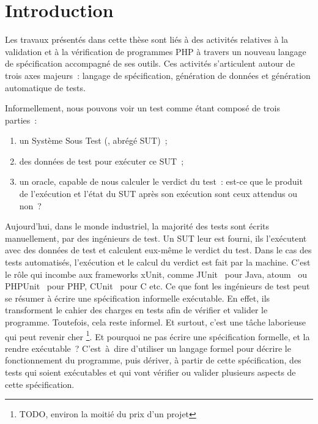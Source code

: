 \chapter{Introduction}
\label{chapter:introduction}

\minitoc

Les travaux présentés dans cette thèse sont liés à des activités relatives à la
validation et à la vérification de programmes PHP à travers un nouveau langage
de spécification accompagné de ses outils. Ces activités s'articulent autour de
trois axes majeurs~: langage de spécification, génération de données et
génération automatique de tests.

Informellement, nous pouvons voir un test comme étant composé de trois parties~:

\begin{enumerate}

\item un Système Sous Test (, abrégé {\strong
SUT})~;

\item des {\strong données de test} pour exécuter ce SUT~;

\item un {\strong oracle}, capable de nous calculer le verdict du test~: est-ce
que le produit de l'exécution et l'état du SUT après son exécution sont ceux
attendus ou non~?

\end{enumerate}

Aujourd'hui, dans le monde industriel, la majorité des tests sont écrits
{\strong manuellement}, par des ingénieurs de test. Un SUT leur est fourni, ils
l'exécutent avec des données de test et calculent eux-même le verdict du test.
Dans le cas des tests {\strong automatisés}, l'exécution et le calcul du verdict
est fait par la machine. C'est le rôle qui incombe aux frameworks xUnit, comme
JUnit~ pour Java, atoum~ ou PHPUnit~
pour PHP, CUnit~ pour C etc. Ce que font les ingénieurs de test
peut se résumer à écrire une spécification informelle exécutable. En effet, ils
transforment le cahier des charges en tests afin de vérifier et valider le
programme. Toutefois, cela reste informel. Et surtout, c'est une tâche
laborieuse qui peut revenir cher \footnote{TODO, environ la moitié du prix d'un
projet}. Et pourquoi ne pas écrire une spécification formelle, et la rendre
exécutable~?  C'est~à~dire d'utiliser un langage formel pour décrire le
fonctionnement du programme, puis dériver, à partir de cette spécification, des
tests qui soient exécutables et qui vont vérifier ou valider plusieurs aspects
de cette spécification. \\

